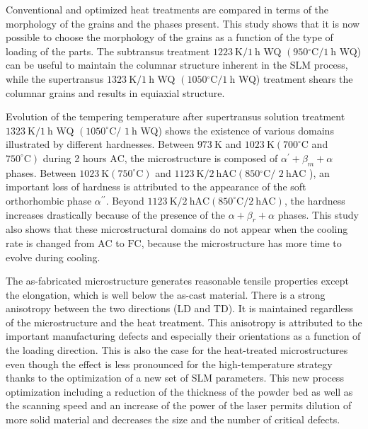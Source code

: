 \documentclass[10pt]{article}
\begin{document}
Conventional and optimized heat treatments are compared in terms of the morphology of the grains and the phases present. This study shows that it is now possible to choose the morphology of the grains as a function of the type of loading of the parts. The subtransus treatment $1223 \mathrm{~K} / 1 \mathrm{~h}$ WQ $\left(950{ }^{\circ} \mathrm{C} / 1 \mathrm{~h}\right.$ WQ) can be useful to maintain the columnar structure inherent in the SLM process, while the supertransus $1323 \mathrm{~K} / 1 \mathrm{~h}$ WQ $\left(1050{ }^{\circ} \mathrm{C} / 1 \mathrm{~h}\right.$ WQ) treatment shears the columnar grains and results in equiaxial structure.

Evolution of the tempering temperature after supertransus solution treatment $1323 \mathrm{~K} / 1 \mathrm{~h}$ WQ $\left(1050^{\circ} \mathrm{C} /\right.$ $1 \mathrm{~h}$ WQ) shows the existence of various domains illustrated by different hardnesses. Between $973 \mathrm{~K}$ and $1023 \mathrm{~K}\left(700^{\circ} \mathrm{C}\right.$ and $\left.750^{\circ} \mathrm{C}\right)$ during 2 hours $\mathrm{AC}$, the microstructure is composed of $\alpha^{\prime}+\beta_{m}+\alpha$ phases. Between $1023 \mathrm{~K}\left(750^{\circ} \mathrm{C}\right)$ and $1123 \mathrm{~K} / 2 \mathrm{~h} \mathrm{AC}\left(850{ }^{\circ} \mathrm{C} /\right.$ $2 \mathrm{~h} \mathrm{AC}$ ), an important loss of hardness is attributed to the appearance of the soft orthorhombic phase $\alpha^{\prime \prime}$. Beyond $1123 \mathrm{~K} / 2 \mathrm{~h} \mathrm{AC}\left(850^{\circ} \mathrm{C} / 2 \mathrm{~h} \mathrm{AC}\right)$, the hardness increases drastically because of the presence of the $\alpha+\beta_{r}+\alpha$ phases. This study also shows that these microstructural domains do not appear when the cooling rate is changed from $\mathrm{AC}$ to $\mathrm{FC}$, because the microstructure has more time to evolve during cooling.

The as-fabricated microstructure generates reasonable tensile properties except the elongation, which is well below the as-cast material. There is a strong anisotropy between the two directions (LD and TD). It is maintained regardless of the microstructure and the heat treatment. This anisotropy is attributed to the important manufacturing defects and especially their orientations as a function of the loading direction. This is also the case for the heat-treated microstructures even though the effect is less pronounced for the high-temperature strategy thanks to the optimization of a new set of SLM parameters. This new process optimization including a reduction of the thickness of the powder bed as well as the scanning speed and an increase of the power of the laser permits dilution of more solid material and decreases the size and the number of critical defects.
\end{document}
